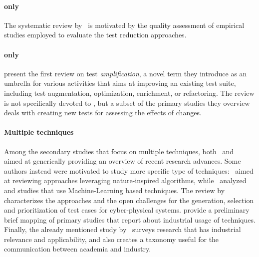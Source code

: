 \paragraph{\tsr only} The systematic review by~\citet{rehman_khan_systematic_2018} is motivated by the quality  assessment  of empirical studies employed to evaluate the test reduction approaches.

\paragraph{\tsa only} \citet{danglot2019snowballing}  present the first review on test \textit{amplification}, a novel term they introduce as an umbrella for various activities that aims at improving an existing test suite, including test augmentation, optimization, enrichment, or refactoring. The review is not specifically devoted to \rt, but a subset of the primary studies they overview deals with creating new tests for assessing the effects of changes.

\paragraph{Multiple techniques} Among the  secondary studies that focus on multiple \rt techniques, 
both~\citet{do_recent_2016} and~\citet{rosero_15_2016} aimed at generically providing an overview of recent
research advances.
Some authors instead were motivated to study more specific type of techniques:~\citet{bajaj_survey_2018} aimed at reviewing \rt approaches leveraging nature-inspired algorithms, while~\citet{pan2022test} analyzed  \tcp and \tcs studies that use Machine-Learning based techniques. The review by~\citet{sadri2022survey} characterizes the approaches and the open challenges for the generation, selection and prioritization of test cases for cyber-physical systems.
\citet{rosero2021software}  provide a preliminary brief mapping of primary studies that report about industrial usage of \rt techniques.
Finally, the already mentioned study by~\citet{bin_ali_search_2019} surveys \rt research that has industrial relevance and applicability, and also creates a taxonomy useful for the communication between academia and industry. 

